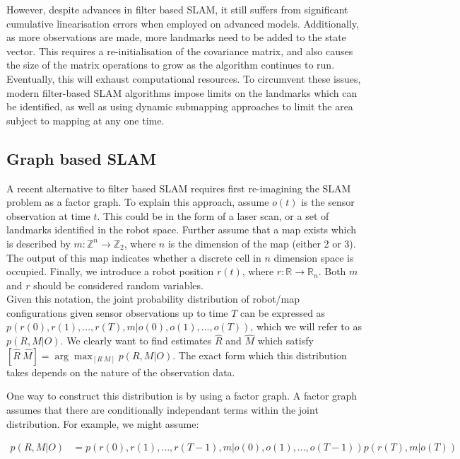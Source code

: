 \documentclass[capstone_report.tex]{subfiles}
\begin{document}
However, despite advances in filter based SLAM, it still suffers from significant cumulative linearisation errors when employed on advanced models. Additionally, as more observations are made, more landmarks need to be added to the state vector. This requires a re-initialisation of the covariance matrix, and also causes the size of the matrix operations to grow as the algorithm continues to run. Eventually, this will exhaust computational resources. To circumvent these issues, modern filter-based SLAM algorithms impose limits on the landmarks which can be identified, as well as using dynamic submapping approaches to limit the area subject to mapping at any one time.

\subsection{Graph based SLAM}
A recent alternative to filter based SLAM requires first re-imagining the SLAM problem as a factor graph. To explain this approach, assume $o(t)$ is the sensor observation at time $t$. This could be in the form of a laser scan, or a set of landmarks identified in the robot space. Further assume that a map exists which is described by $m:\mathbb Z^n\to\mathbb Z_2$, where $n$ is the dimension of the map (either 2 or 3). The output of this map indicates whether a discrete cell in $n$ dimension space is occupied. Finally, we introduce a robot position $r(t)$, where $r:\mathbb R\to\mathbb R_n$. Both $m$ and $r$ should be considered random variables.\\

Given this notation, the joint probability distribution of robot/map configurations given sensor observations up to time $T$ can be expressed as $p(r(0), r(1), ... , r(T), m | o(0), o(1), ... , o(T))$, which we will refer to as $p(R,M|O)$. We clearly want to find estimates $\hat{R}$ and $\hat{M}$ which satisfy $[\hat{R} \ \hat{M}] = \arg \max_{[R \  M]} p(R,M|O)$. The exact form which this distribution takes depends on the nature of the observation data.

One way to construct this distribution is by using a factor graph. A factor graph assumes that there are conditionally independant terms within the joint distribution. For example, we might assume:

\begin{align*}
  p(R,M|O)&= p(r(0), r(1), ... , r(T-1), m | o(0), o(1), ... , o(T-1))p(r(T), m | o(T))
\end{align*}
\end{document}

